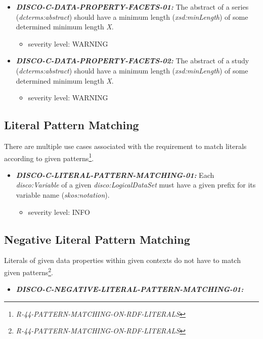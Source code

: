 \documentclass{llncs}
\begin{document}
\begin{itemize}
	\item \textbf{{\em DISCO-C-DATA-PROPERTY-FACETS-01:}} The abstract of a series (\emph{dcterms:abstract}) should have a minimum length (\emph{xsd:minLength}) of some determined minimum length \emph{X}. 
	\begin{itemize}
		\item severity level: WARNING
	\end{itemize}
	\item \textbf{{\em DISCO-C-DATA-PROPERTY-FACETS-02:}} The abstract of a study (\emph{dcterms:abstract}) should have a minimum length (\emph{xsd:minLength}) of some determined minimum length \emph{X}. 
	\begin{itemize}
		\item severity level: WARNING
	\end{itemize}
\end{itemize}

\subsection{Literal Pattern Matching}

There are multiple use cases associated with the requirement to match literals according to given patterns\footnote{\emph{R-44-PATTERN-MATCHING-ON-RDF-LITERALS}}.

\begin{itemize}
	\item \textbf{{\em DISCO-C-LITERAL-PATTERN-MATCHING-01:}} Each \emph{disco:Variable} of a given \emph{disco:LogicalDataSet} must have a given prefix for its variable name (\emph{skos:notation}). 
	\begin{itemize}
		\item severity level: INFO
	\end{itemize}
\end{itemize}

\subsection{Negative Literal Pattern Matching}

Literals of given data properties within given contexts do not have to match given patterns\footnote{\emph{R-44-PATTERN-MATCHING-ON-RDF-LITERALS}}. 

\begin{itemize}
	\item \textbf{{\em DISCO-C-NEGATIVE-LITERAL-PATTERN-MATCHING-01:}} 
\end{itemize}
\end{document}
